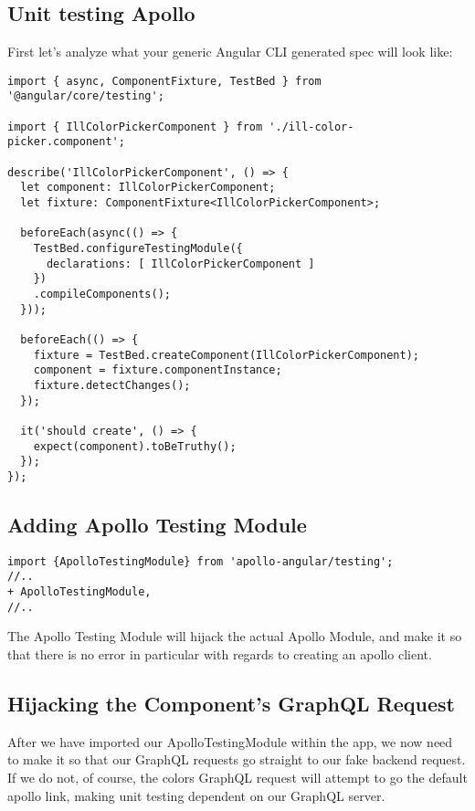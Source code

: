 \subsection { Unit testing Apollo }
First let's analyze what your generic Angular CLI generated spec will look like:
\begin{lstlisting}
import { async, ComponentFixture, TestBed } from '@angular/core/testing';

import { IllColorPickerComponent } from './ill-color-picker.component';

describe('IllColorPickerComponent', () => {
  let component: IllColorPickerComponent;
  let fixture: ComponentFixture<IllColorPickerComponent>;

  beforeEach(async(() => {
    TestBed.configureTestingModule({
      declarations: [ IllColorPickerComponent ]
    })
    .compileComponents();
  }));

  beforeEach(() => {
    fixture = TestBed.createComponent(IllColorPickerComponent);
    component = fixture.componentInstance;
    fixture.detectChanges();
  });

  it('should create', () => {
    expect(component).toBeTruthy();
  });
});

\end{lstlisting}

\subsection { Adding Apollo Testing Module }

\begin{lstlisting}
import {ApolloTestingModule} from 'apollo-angular/testing';
//..
+ ApolloTestingModule,
//..
\end{lstlisting}

The Apollo Testing Module will hijack the actual Apollo Module, and make it so
that there is no error in particular with regards to creating an apollo client.

\subsection { Hijacking the Component's GraphQL Request }
After we have imported our ApolloTestingModule within the app, we now need to
make it so that our GraphQL requests go straight to our fake backend request.
If we do not, of course, the colors GraphQL request will attempt to go the
default apollo link, making unit testing dependent on our GraphQL server.

